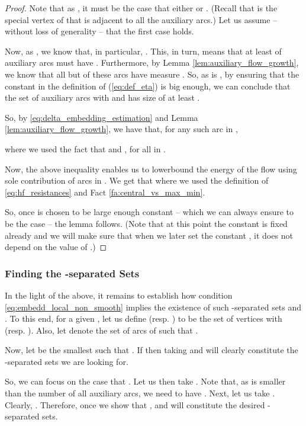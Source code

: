 \documentclass[11pt, letterpaper]{article}
\begin{document}
\begin{proof}
Note that as , it must be the case that either  or . (Recall that  is the special vertex of  that is adjacent to all the auxiliary arcs.) Let us assume -- without loss of generality -- that the first case holds.


Now, as , we know that, in particular, . This, in turn, means that at least  of auxiliary arcs  must have . Furthermore, by Lemma \ref{lem:auxiliary_flow_growth}, we know that all but  of these arcs have measure . So, as  is , by ensuring that the constant  in the definition of  (\eqref{eq:def_eta}) is big enough, we can conclude that the set  of auxiliary arcs with  and  has size of at least .

So, by \eqref{eq:delta_embedding_estimation} and Lemma \ref{lem:auxiliary_flow_growth}, we have that, for any such arc  in ,

where we used the fact that  and , for all  in .

Now, the above inequality enables us to lowerbound the energy  of the flow  using sole contribution of arcs in . We get that 
where we used the definition of  \eqref{eq:hf_resistances} and Fact \ref{fa:central_vs_max_min}.

So, once  is chosen to be large enough constant -- which we can always ensure to be the case -- the lemma follows. (Note that at this point the constant  is fixed already and we will make sure that when we later set the constant , it does not depend on the value of .) 
\end{proof}



\subsubsection*{Finding the -separated Sets}

In the light of the above, it remains to establish how condition \eqref{eq:embedd_local_non_smooth} implies the existence of such -separated sets  and .  To this end, for a given , let us define  (resp. ) to be the set of vertices  with  (resp. ). Also, let  denote the set of arcs  of  such that . 

Now, let  be the smallest  such that . If  then taking  and  will clearly constitute the -separated sets we are looking for. 

So, we can focus on the case that . Let us then take . Note that, as  is smaller than the number of all auxiliary arcs, we need to have . Next, let us take . Clearly, . Therefore, once we show that ,  and  will constitute the desired -separated sets.
\end{document}
